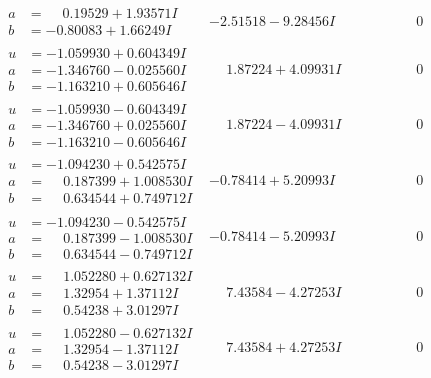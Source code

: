 \documentclass[1p]{elsarticle_modified}
\theoremstyle{definition}
\begin{document}
$$\begin{array}{c|c|c}
\begin{aligned}
a &= \phantom{-}0.19529 + 1.93571 I \\
b &= -0.80083 + 1.66249 I\end{aligned}
 & -2.51518 - 9.28456 I & \phantom{-0.000000 } 0 \\ \hline\begin{aligned}
u &= -1.059930 + 0.604349 I \\
a &= -1.346760 - 0.025560 I \\
b &= -1.163210 + 0.605646 I\end{aligned}
 & \phantom{-}1.87224 + 4.09931 I & \phantom{-0.000000 } 0 \\ \hline\begin{aligned}
u &= -1.059930 - 0.604349 I \\
a &= -1.346760 + 0.025560 I \\
b &= -1.163210 - 0.605646 I\end{aligned}
 & \phantom{-}1.87224 - 4.09931 I & \phantom{-0.000000 } 0 \\ \hline\begin{aligned}
u &= -1.094230 + 0.542575 I \\
a &= \phantom{-}0.187399 + 1.008530 I \\
b &= \phantom{-}0.634544 + 0.749712 I\end{aligned}
 & -0.78414 + 5.20993 I & \phantom{-0.000000 } 0 \\ \hline\begin{aligned}
u &= -1.094230 - 0.542575 I \\
a &= \phantom{-}0.187399 - 1.008530 I \\
b &= \phantom{-}0.634544 - 0.749712 I\end{aligned}
 & -0.78414 - 5.20993 I & \phantom{-0.000000 } 0 \\ \hline\begin{aligned}
u &= \phantom{-}1.052280 + 0.627132 I \\
a &= \phantom{-}1.32954 + 1.37112 I \\
b &= \phantom{-}0.54238 + 3.01297 I\end{aligned}
 & \phantom{-}7.43584 - 4.27253 I & \phantom{-0.000000 } 0 \\ \hline\begin{aligned}
u &= \phantom{-}1.052280 - 0.627132 I \\
a &= \phantom{-}1.32954 - 1.37112 I \\
b &= \phantom{-}0.54238 - 3.01297 I\end{aligned}
 & \phantom{-}7.43584 + 4.27253 I & \phantom{-0.000000 } 0\\

\end{array}$$
\end{document}
